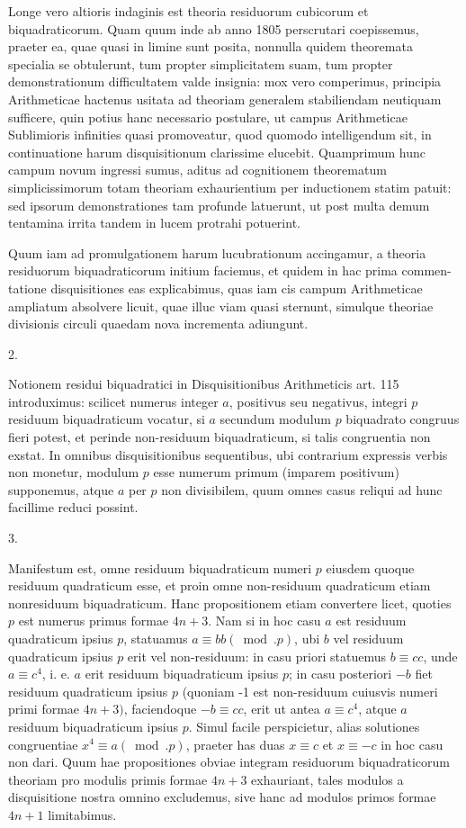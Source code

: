 \documentclass[10pt]{article}
\begin{document}
Longe vero altioris indaginis est theoria residuorum cubicorum et biquadraticorum. Quam quum inde ab anno 1805 perscrutari coepissemus, praeter ea, quae quasi in limine sunt posita, nonnulla quidem theoremata specialia se obtulerunt, tum propter simplicitatem suam, tum propter demonstrationum difficultatem valde insignia: mox vero comperimus, principia Arithmeticae hactenus usitata ad theoriam generalem stabiliendam neutiquam sufficere, quin potius hanc necessario postulare, ut campus Arithmeticae Sublimioris infinities quasi promoveatur, quod quomodo intelligendum sit, in continuatione harum disquisitionum clarissime elucebit. Quamprimum hunc campum novum ingressi sumus, aditus ad cognitionem theorematum simplicissimorum totam theoriam exhaurientium per inductionem statim patuit: sed ipsorum demonstrationes tam profunde latuerunt, ut post multa demum tentamina irrita tandem in lucem protrahi potuerint.

Quum iam ad promulgationem harum lucubrationum accingamur, a theoria residuorum biquadraticorum initium faciemus, et quidem in hac prima commen-
tatione disquisitiones eas explicabimus, quas iam cis campum Arithmeticae ampliatum absolvere licuit, quae illuc viam quasi sternunt, simulque theoriae divisionis circuli quaedam nova incrementa adiungunt.

2.

Notionem residui biquadratici in Disquisitionibus Arithmeticis art. 115 introduximus: scilicet numerus integer \(a\), positivus seu negativus, integri \(p\) residuum biquadraticum vocatur, si \(a\) secundum modulum \(p\) biquadrato congruus fieri potest, et perinde non-residuum biquadraticum, si talis congruentia non exstat. In omnibus disquisitionibus sequentibus, ubi contrarium expressis verbis non monetur, modulum \(p\) esse numerum primum (imparem positivum) supponemus, atque \(a\) per \(p\) non divisibilem, quum omnes casus reliqui ad hunc facillime reduci possint.

3.

Manifestum est, omne residuum biquadraticum numeri \(p\) eiusdem quoque residuum quadraticum esse, et proin omne non-residuum quadraticum etiam nonresiduum biquadraticum. Hanc propositionem etiam convertere licet, quoties \(p\) est numerus primus formae \(4 n+3\). Nam si in hoc casu \(a\) est residuum quadraticum ipsius \(p\), statuamus \(a \equiv b b(\bmod . p)\), ubi \(b\) vel residuum quadraticum ipsius \(p\) erit vel non-residuum: in casu priori statuemus \(b \equiv c c\), unde \(a \equiv c^{4}\), i. e. \(a\) erit residuum biquadraticum ipsius \(p\); in casu posteriori \(-b\) fiet residuum quadraticum ipsius \(p\) (quoniam -1 est non-residuum cuiusvis numeri primi formae \(4 n+3)\), faciendoque \(-b \equiv c c\), erit ut antea \(a \equiv c^{4}\), atque \(a\) residuum biquadraticum ipsius \(p\). Simul facile perspicietur, alias solutiones congruentiae \(x^{4} \equiv a(\bmod . p)\), praeter has duas \(x \equiv c\) et \(x \equiv-c\) in hoc casu non dari. Quum hae propositiones obviae integram residuorum biquadraticorum theoriam pro modulis primis formae \(4 n+3\) exhauriant, tales modulos a disquisitione nostra omnino excludemus, sive hanc ad modulos primos formae \(4 n+1\) limitabimus.
\end{document}
